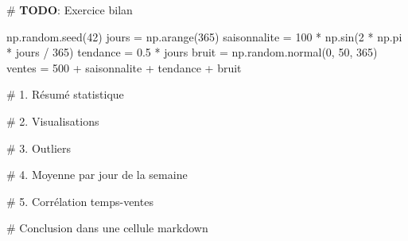 \documentclass[
  french,
  11pt,
  a4paper,
]{scrbook}
\newenvironment{Shaded}{}{}
\newcommand{\AlertTok}[1]{\textcolor[rgb]{1.00,0.33,0.33}{\textbf{#1}}}
\newcommand{\CommentTok}[1]{\textcolor[rgb]{0.42,0.45,0.49}{#1}}
\newcommand{\DecValTok}[1]{\textcolor[rgb]{0.00,0.36,0.77}{#1}}
\newcommand{\FloatTok}[1]{\textcolor[rgb]{0.00,0.36,0.77}{#1}}
\newcommand{\NormalTok}[1]{\textcolor[rgb]{0.14,0.16,0.18}{#1}}
\newcommand{\OperatorTok}[1]{\textcolor[rgb]{0.14,0.16,0.18}{#1}}
\begin{document}
\begin{Shaded}
\begin{Highlighting}[]
\CommentTok{\# }\AlertTok{TODO}\CommentTok{: Exercice bilan}

\NormalTok{np.random.seed(}\DecValTok{42}\NormalTok{)}
\NormalTok{jours }\OperatorTok{=}\NormalTok{ np.arange(}\DecValTok{365}\NormalTok{)}
\NormalTok{saisonnalite }\OperatorTok{=} \DecValTok{100} \OperatorTok{*}\NormalTok{ np.sin(}\DecValTok{2} \OperatorTok{*}\NormalTok{ np.pi }\OperatorTok{*}\NormalTok{ jours }\OperatorTok{/} \DecValTok{365}\NormalTok{)}
\NormalTok{tendance }\OperatorTok{=} \FloatTok{0.5} \OperatorTok{*}\NormalTok{ jours}
\NormalTok{bruit }\OperatorTok{=}\NormalTok{ np.random.normal(}\DecValTok{0}\NormalTok{, }\DecValTok{50}\NormalTok{, }\DecValTok{365}\NormalTok{)}
\NormalTok{ventes }\OperatorTok{=} \DecValTok{500} \OperatorTok{+}\NormalTok{ saisonnalite }\OperatorTok{+}\NormalTok{ tendance }\OperatorTok{+}\NormalTok{ bruit}

\CommentTok{\# 1. Résumé statistique}


\CommentTok{\# 2. Visualisations}


\CommentTok{\# 3. Outliers}


\CommentTok{\# 4. Moyenne par jour de la semaine}


\CommentTok{\# 5. Corrélation temps{-}ventes}


\CommentTok{\# Conclusion dans une cellule markdown}
\end{Highlighting}
\end{Shaded}
\end{document}
